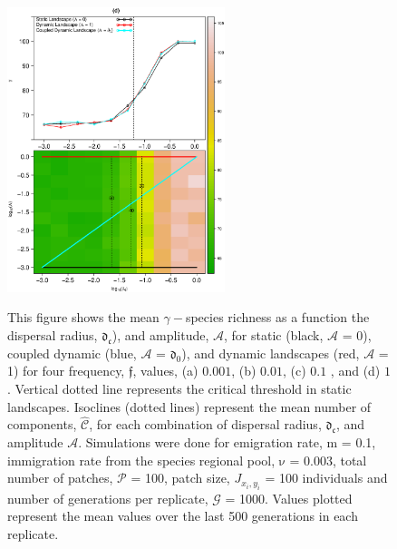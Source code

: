 \documentclass[12pt]{article}
\begin{document}
\begin{figure}[hb!]
\begin{center}
\includegraphics[width=2.5in]{./figures/new_A_r0_MeanGamma_010.eps}\\
\end{center}
\caption{This figure shows the mean $\gamma-$species
    richness as a function the dispersal radius, $\mathfrak{d_{c}}$), and amplitude, $\mathcal{A}$, for static
    (black, $\mathcal{A}$ = 0), coupled dynamic (blue, $\mathcal{A}$ =
    $\mathfrak{d_{0}}$), and dynamic landscapes (red, $\mathcal{A}$ =
    1) for four frequency, $\mathfrak{f}$, values, (a) $0.001$, (b)
    $0.01$, (c) $0.1$ , and (d) $1$. Vertical dotted line represents
    the critical threshold in static landscapes. Isoclines
    (dotted lines) represent the mean number of components,
    $\hat{\mathcal{C}}$, for each combination of dispersal radius,
    $\mathfrak{d_{c}}$, and amplitude $\mathcal{A}$. Simulations were
    done for emigration rate, $\mathrm{m}$ = 0.1, immigration rate
    from the species regional pool, $\mathrm{\nu}$ = 0.003, total
    number of patches, $\mathcal{P}$ = 100, patch size, $J_{x_i,y_i}$
    = 100 individuals and number of generations per replicate,
    $\mathcal{G}$ = 1000. Values plotted represent the mean values
    over the last 500 generations in each replicate.}
\label{fig:SI-D1}
\end{figure}
\end{document}
